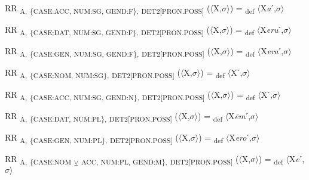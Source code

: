 {\begin{exe}
 RR \textsubscript{A,} \textsubscript{\{CASE:ACC, NUM:SG, GEND:F\},} \textsubscript{DET2[PRON.POSS]} ($\langle$X,$\sigma $$\rangle$) = \textsubscript{def} $\langle$X\textit{a}ˊ,$\sigma $$\rangle$
\end{exe}

\begin{exe}
 RR \textsubscript{A,} \textsubscript{\{CASE:DAT, NUM:SG, GEND:F\},} \textsubscript{DET2[PRON.POSS]} ($\langle$X,$\sigma $$\rangle$) = \textsubscript{def} $\langle$X\textit{eru}ˊ,$\sigma $$\rangle$
\end{exe}

\begin{exe}
 RR \textsubscript{A,} \textsubscript{\{CASE:GEN, NUM:SG, GEND:F\},} \textsubscript{DET2[PRON.POSS]} ($\langle$X,$\sigma $$\rangle$) = \textsubscript{def} $\langle$X\textit{era}ˊ,$\sigma $$\rangle$
\end{exe}

\begin{exe}
 RR \textsubscript{A,} \textsubscript{\{CASE:NOM, NUM:SG\},} \textsubscript{DET2[PRON.POSS]} ($\langle$X,$\sigma $$\rangle$) = \textsubscript{def} $\langle$Xˊ,$\sigma $$\rangle$
\end{exe}

\begin{exe}
 RR \textsubscript{A,} \textsubscript{\{CASE:ACC, NUM:SG, GEND:N\},} \textsubscript{DET2[PRON.POSS]} ($\langle$X,$\sigma $$\rangle$) = \textsubscript{def} $\langle$Xˊ,$\sigma $$\rangle$
\end{exe}

\begin{exe}
 RR \textsubscript{A,} \textsubscript{\{CASE:DAT, NUM:PL\},} \textsubscript{DET2[PRON.POSS]} ($\langle$X,$\sigma $$\rangle$) = \textsubscript{def} $\langle$X\textit{\=em}ˊ,$\sigma $$\rangle$
\end{exe}

\begin{exe}
 RR \textsubscript{A,} \textsubscript{\{CASE:GEN, NUM:PL\},} \textsubscript{DET2[PRON.POSS]} ($\langle$X,$\sigma $$\rangle$) = \textsubscript{def} $\langle$X\textit{ero}ˊ,$\sigma $$\rangle$
\end{exe}

\begin{exe}
 RR \textsubscript{A,} \textsubscript{\{CASE:NOM} \textsubscript{${\veebar}$}\textsubscript{ ACC, NUM:PL, GEND:M\},} \textsubscript{DET2[PRON.POSS]} ($\langle$X,$\sigma $$\rangle$) = \textsubscript{def} $\langle$X\textit{e}ˊ,$\sigma $$\rangle$
\end{exe}

}
